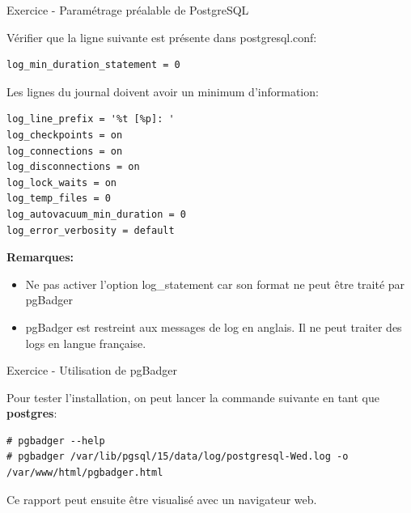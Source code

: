 \begin{frame}[fragile]{Exercice - Paramétrage préalable de PostgreSQL}

   Vérifier que la ligne suivante est présente dans postgresql.conf:

\begin{tiny}
\begin{Verbatim}[commandchars=\\\{\}]
log_min_duration_statement = 0
\end{Verbatim}
\end{tiny}

Les lignes du journal doivent avoir un minimum d'information:

\begin{tiny}
\begin{Verbatim}[commandchars=\\\{\}]
log_line_prefix = '%t [%p]: '
log_checkpoints = on
log_connections = on
log_disconnections = on
log_lock_waits = on
log_temp_files = 0
log_autovacuum_min_duration = 0
log_error_verbosity = default
\end{Verbatim}
\end{tiny}

   \textbf{Remarques:}
\begin{itemize}
   \item Ne pas activer l'option log\_statement car son format ne peut être traité par pgBadger
   \item pgBadger est restreint aux messages de log en anglais. Il ne peut traiter des logs en langue française.
\end{itemize}

\end{frame}


\begin{frame}[fragile]{Exercice - Utilisation de pgBadger}

Pour tester l'installation, on peut lancer la commande suivante en tant que \textbf{postgres}:

\begin{tiny}
\begin{Verbatim}[commandchars=\\\{\}]
# pgbadger --help
# pgbadger /var/lib/pgsql/15/data/log/postgresql-Wed.log -o /var/www/html/pgbadger.html
\end{Verbatim}
\end{tiny}

Ce rapport peut ensuite être visualisé avec un navigateur web.

\end{frame}

